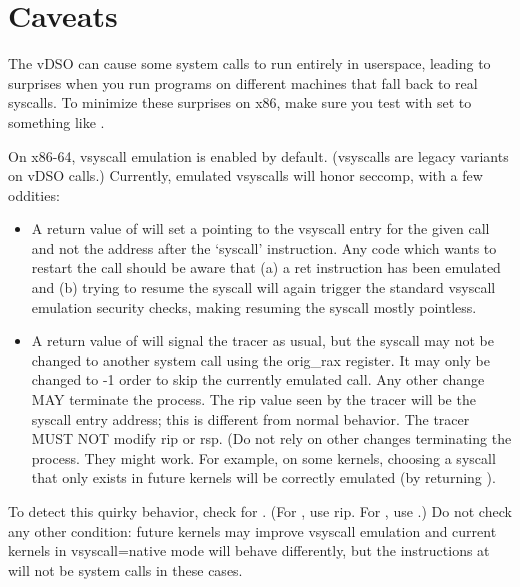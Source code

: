 \documentclass[a4paper,8pt,english]{sphinxmanual}
\begin{document}
\section{Caveats}
\label{userspace-api/seccomp_filter:caveats}
The vDSO can cause some system calls to run entirely in userspace,
leading to surprises when you run programs on different machines that
fall back to real syscalls.  To minimize these surprises on x86, make
sure you test with
 set to
something like .

On x86-64, vsyscall emulation is enabled by default.  (vsyscalls are
legacy variants on vDSO calls.)  Currently, emulated vsyscalls will
honor seccomp, with a few oddities:
\begin{itemize}
\item {} 
A return value of  will set a  pointing to
the vsyscall entry for the given call and not the address after the
`syscall' instruction.  Any code which wants to restart the call
should be aware that (a) a ret instruction has been emulated and (b)
trying to resume the syscall will again trigger the standard vsyscall
emulation security checks, making resuming the syscall mostly
pointless.

\item {} 
A return value of  will signal the tracer as usual,
but the syscall may not be changed to another system call using the
orig\_rax register. It may only be changed to -1 order to skip the
currently emulated call. Any other change MAY terminate the process.
The rip value seen by the tracer will be the syscall entry address;
this is different from normal behavior.  The tracer MUST NOT modify
rip or rsp.  (Do not rely on other changes terminating the process.
They might work.  For example, on some kernels, choosing a syscall
that only exists in future kernels will be correctly emulated (by
returning ).

\end{itemize}

To detect this quirky behavior, check for .  (For , use rip.  For
, use .)  Do not check any other
condition: future kernels may improve vsyscall emulation and current
kernels in vsyscall=native mode will behave differently, but the
instructions at  will not be system calls in these
cases.
\end{document}
